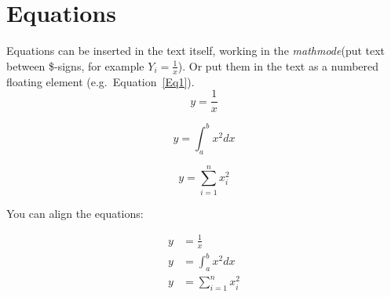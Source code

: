 \newpage

\section{Equations}
Equations can be inserted in the text itself, working in the \textit{mathmode}(put text between \$-signs, for example $Y_i=\frac{1}{x}$). Or put them in the text as a numbered floating element (e.g.\ Equation~\eqref{Eq1}).
\begin{equation}\label{Eq1}
    y=\frac{1}{x}
\end{equation}

\begin{equation}
    y=\int_{a}^{b} x^2 dx
\end{equation}

\begin{equation}
    y=\sum_{i=1}^{n} x_i^2
\end{equation}

You can align the equations:

\begin{align}
    y &=\frac{1}{x} \\
    y &=\int_{a}^{b} x^2 dx \\
    y &=\sum_{i=1}^{n} x_i^2
\end{align}